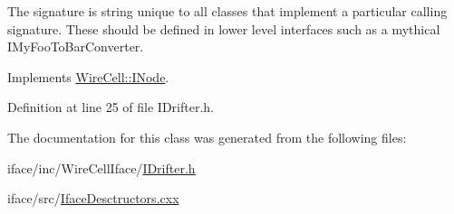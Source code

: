The signature is string unique to all classes that implement a particular calling signature. These should be defined in lower level interfaces such as a mythical I\+My\+Foo\+To\+Bar\+Converter. 

Implements \hyperlink{class_wire_cell_1_1_i_node_a0b0763465adf5ba7febe8e378162b584}{Wire\+Cell\+::\+I\+Node}.



Definition at line 25 of file I\+Drifter.\+h.



The documentation for this class was generated from the following files\+:\begin{DoxyCompactItemize}
\item 
iface/inc/\+Wire\+Cell\+Iface/\hyperlink{_i_drifter_8h}{I\+Drifter.\+h}\item 
iface/src/\hyperlink{_iface_desctructors_8cxx}{Iface\+Desctructors.\+cxx}\end{DoxyCompactItemize}
